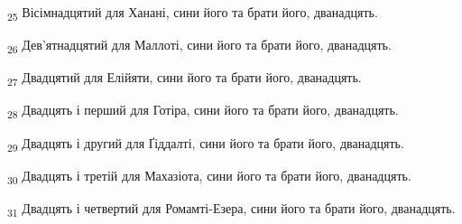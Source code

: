 \begin{tcolorbox}
\textsubscript{25} Вісімнадцятий для Ханані, сини його та брати його, дванадцять.
\end{tcolorbox}
\begin{tcolorbox}
\textsubscript{26} Дев'ятнадцятий для Маллоті, сини його та брати його, дванадцять.
\end{tcolorbox}
\begin{tcolorbox}
\textsubscript{27} Двадцятий для Елійяти, сини його та брати його, дванадцять.
\end{tcolorbox}
\begin{tcolorbox}
\textsubscript{28} Двадцять і перший для Готіра, сини його та брати його, дванадцять.
\end{tcolorbox}
\begin{tcolorbox}
\textsubscript{29} Двадцять і другий для Ґіддалті, сини його та брати його, дванадцять.
\end{tcolorbox}
\begin{tcolorbox}
\textsubscript{30} Двадцять і третій для Махазіота, сини його та брати його, дванадцять.
\end{tcolorbox}
\begin{tcolorbox}
\textsubscript{31} Двадцять і четвертий для Ромамті-Езера, сини його та брати його, дванадцять.
\end{tcolorbox}
